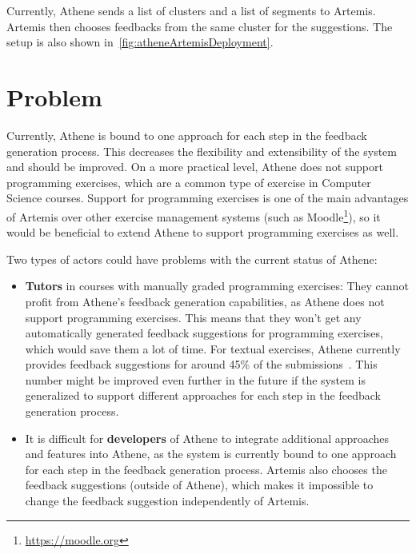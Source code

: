 Currently, Athene sends a list of clusters and a list of segments to Artemis. Artemis then chooses feedbacks from the same cluster for the suggestions. The setup is also shown in~\cref{fig:atheneArtemisDeployment}.


\section*{Problem}

Currently, Athene is bound to one approach for each step in the feedback generation process. This decreases the flexibility and extensibility of the system and should be improved.
On a more practical level, Athene does not support programming exercises, which are a common type of exercise in Computer Science courses. Support for programming exercises is one of the main advantages of Artemis over other exercise management systems (such as Moodle\footnote{\url{https://moodle.org}}), so it would be beneficial to extend Athene to support programming exercises as well.

Two types of actors could have problems with the current status of Athene:
\begin{itemize}
    \item \textbf{Tutors} in courses with manually graded programming exercises: They cannot profit from Athene's feedback generation capabilities, as Athene does not support programming exercises. This means that they won't get any automatically generated feedback suggestions for programming exercises, which would save them a lot of time.
    For textual exercises, Athene currently provides feedback suggestions for around 45\% of the submissions~\cite{cofee2}. This number might be improved even further in the future if the system is generalized to support different approaches for each step in the feedback generation process.
    \item It is difficult for \textbf{developers} of Athene to integrate additional approaches and features into Athene, as the system is currently bound to one approach for each step in the feedback generation process. Artemis also chooses the feedback suggestions (outside of Athene), which makes it impossible to change the feedback suggestion independently of Artemis.
\end{itemize}

